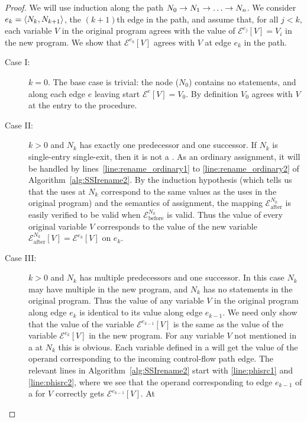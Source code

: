 \begin{proof}
We will use induction along the path $N_0\rightarrow N_1\rightarrow\ldots\rightarrow N_n$.
We consider $e_k=\left\langle N_{k},N_{k+1} \right\rangle$, the $(k+1)$th edge in the path,
and assume that, for all $j<k$, each variable $V$ in the original
program agrees with the value of $\mathcal{E}^{e_j}[V]=V_i$ in the new
program.  We show that $\mathcal{E}^{e_k}[V]$ agrees with $V$ at edge
$e_k$ in the path.
\begin{description}
\item[Case I:] $k=0$. The base case is trivial: the  node
($N_0$) contains no statements, and along each edge $e$ leaving start
$\mathcal{E}^e[V]=V_0$.  By definition $V_0$ agrees with $V$ at the
entry to the procedure.
\item[Case II:] $k>0$ and $N_k$ has exactly one predecessor and one successor.
If $N_k$ is single-entry single-exit, then it is not a \phisigfunction[or].
As an ordinary assignment, it will be handled by
lines~\ref{line:rename_ordinary1} to \ref{line:rename_ordinary2} of
Algorithm~\vref{alg:SSIrename2}.  By the induction hypothesis (which
tells us that the uses at $N_k$ correspond to the same values as the
uses in the original program) and the semantics of
assignment, the mapping $\mathcal{E}_{\text{after}}^{N_k}$ is easily
verified to be valid when $\mathcal{E}_{\text{before}}^{N_k}$ is
valid.  Thus the value of every original variable $V$ corresponds to
the value of the new variable 
$\mathcal{E}_{\text{after}}^{N_k}[V]=\mathcal{E}^{e_k}[V]$ on $e_k$.
\item[Case III:] $k>0$ and $N_k$ has multiple predecessors and one
successor.  In this case $N_k$ may have multiple  in
the new program, and  $N_k$
has no statements in the original program.  Thus the value of any
variable $V$ in the original program along edge $e_k$ is identical to
its value along edge $e_{k-1}$.  We need only show that the value of
the variable $\mathcal{E}^{e_{k-1}}[V]$ is the same as the value of
the variable $\mathcal{E}^{e_k}[V]$ in the new program.  For any
variable $V$ not mentioned in a \phifunction{} at $N_k$ this is
obvious.  Each variable defined in a \phifunction{} will get the value
of the operand corresponding to the incoming control-flow path edge.
The relevant lines in Algorithm~\ref{alg:SSIrename2} start with
\ref{line:phisrc1} and \ref{line:phisrc2}, where we see that the
operand corresponding to edge $e_{k-1}$ of a \phifunction{} for $V$
correctly gets $\mathcal{E}^{e_{k-1}}[V]$.  At

\end{description}
\end{proof}
